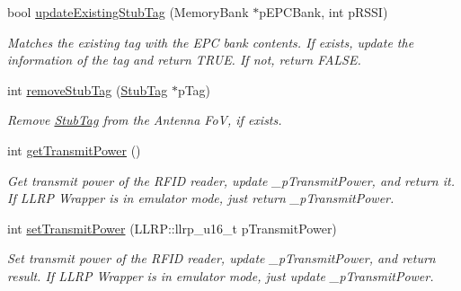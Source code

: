 \begin{DoxyCompactItemize}
bool \hyperlink{class_e_l_f_i_n_1_1_stub_antenna_aa42fa66b71bfa1c8224b79cded75b9d9}{update\-Existing\-Stub\-Tag} (Memory\-Bank $\ast$p\-E\-P\-C\-Bank, int p\-R\-S\-S\-I)
\begin{DoxyCompactList}\small\item\em Matches the existing tag with the E\-P\-C bank contents. If exists, update the information of the tag and return T\-R\-U\-E. If not, return F\-A\-L\-S\-E. \end{DoxyCompactList}\item 
int \hyperlink{class_e_l_f_i_n_1_1_stub_antenna_a623831bc7a642ed3a86019b034317ca0}{remove\-Stub\-Tag} (\hyperlink{class_e_l_f_i_n_1_1_stub_tag}{Stub\-Tag} $\ast$p\-Tag)
\begin{DoxyCompactList}\small\item\em Remove \hyperlink{class_e_l_f_i_n_1_1_stub_tag}{Stub\-Tag} from the Antenna Fo\-V, if exists. \end{DoxyCompactList}\item 
int \hyperlink{class_e_l_f_i_n_1_1_stub_antenna_a36b10b8ea3c294e0b9deb1c012f752ad}{get\-Transmit\-Power} ()
\begin{DoxyCompactList}\small\item\em Get transmit power of the R\-F\-I\-D reader, update \-\_\-p\-Transmit\-Power, and return it. If L\-L\-R\-P Wrapper is in emulator mode, just return \-\_\-p\-Transmit\-Power. \end{DoxyCompactList}\item 
int \hyperlink{class_e_l_f_i_n_1_1_stub_antenna_a2a3b53c5d8c6d9b004b79a84a1114b59}{set\-Transmit\-Power} (L\-L\-R\-P\-::llrp\-\_\-u16\-\_\-t p\-Transmit\-Power)
\begin{DoxyCompactList}\small\item\em Set transmit power of the R\-F\-I\-D reader, update \-\_\-p\-Transmit\-Power, and return result. If L\-L\-R\-P Wrapper is in emulator mode, just update \-\_\-p\-Transmit\-Power. \end{DoxyCompactList}\end{DoxyCompactItemize}
{\bf }\par
